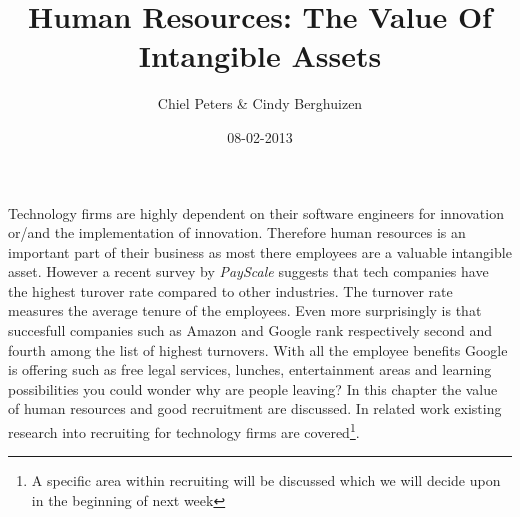 \documentclass{article}
\begin{document}
\title{Human Resources: The Value Of Intangible Assets}
\author{Chiel Peters \& Cindy Berghuizen}
\date{08-02-2013}
\maketitle

\setlength\parindent{0pt}

Technology firms are highly dependent on their software engineers for innovation or/and the implementation of innovation. Therefore human resources is an important part of their business as most there employees are a valuable intangible asset. However a recent survey by \textit{PayScale} \cite{turnover} suggests that tech companies have the highest turover rate compared to other industries. The turnover rate measures the average tenure of the employees. Even more surprisingly is that succesfull companies such as Amazon and Google rank respectively second and fourth among the list of highest turnovers. With all the employee benefits Google is offering such as free legal services, lunches, entertainment areas and learning possibilities you could wonder why are people leaving? In this chapter the value of human resources and good recruitment are discussed. In related work existing research into recruiting for technology firms are covered\footnote{A specific area within recruiting will be discussed which we will decide upon in the beginning of next week}.
\end{document}
